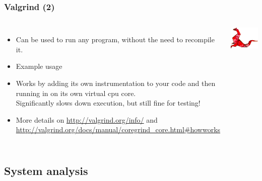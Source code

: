 \begin{frame}
  \frametitle{Valgrind (2)}
  \begin{columns}[T]
    \begin{itemize}
    \item Can be used to run any program, without the need to
      recompile it.
    \item Example usage\\
    \item Works by adding its own instrumentation to your code and
      then running in on its own virtual cpu core.\\
      Significantly slows down execution, but still fine for testing!
    \item More details on \url{http://valgrind.org/info/} and
      \url{http://valgrind.org/docs/manual/coregrind_core.html\#howworks}
    \end{itemize}
    \includegraphics[width=\textwidth]{slides/sysdev-application-development/valgrind2.png}
  \end{columns}
\end{frame}

\subsection{System analysis}

